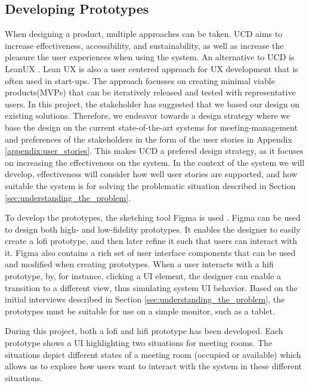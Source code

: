 \subsection{Developing Prototypes}\label{subsec:develop_proto}
When designing a product, multiple approaches can be taken.  
UCD aims to increase effectiveness, accessibility, and sustainability, as well as increase the pleasure the user experiences when using the system\cite{user-centred-design}. 
An alternative to UCD is LeanUX \cite{Lean_UX}.
Lean UX is also a user centered approach for UX development that is often used in start-ups.
The approach focusses on creating minimal viable products(MVPs) that can be iteratively released and tested with representative users. 
In this project, the stakeholder has suggested that we based our design on existing solutions.
Therefore, we endeavor towards a design strategy where we base the design on the current state-of-the-art systems for meeting-management and preferences of the stakeholders in the form of the user stories in Appendix \ref{appendix:user_stories}.
This makes UCD a prefered design strategy, as it focuses on increasing the effectiveness on the system.
In the context of the system we will develop, effectiveness will consider how well user stories are supported, and how suitable the system is for solving the problematic situation described in Section \ref{sec:understanding_the_problem}.

To develop the prototypes, the sketching tool Figma is used \cite{Figma}.
Figma can be used to design both high- and low-fidelity prototypes. 
It enables the designer to easily create a lofi prototype, and then later refine it such that users can interact with it.
Figma also contains a rich set of user interface components that can be used and modified when creating prototypes.
When a user interacts with a hifi prototype, by, for instance, clicking a UI element, the designer can enable a transition to a different view, thus simulating system UI behavior.
Based on the initial interviews described in Section \ref{sec:understanding_the_problem}, the prototypes must be suitable for use on a simple monitor, such as a tablet.

During this project, both a lofi and hifi prototype has been developed.
Each prototype shows a UI highlighting two situations for meeting rooms. 
The situations depict different states of a meeting room (occupied or available) which allows us to explore how users want to interact with the system in these different situations. 


